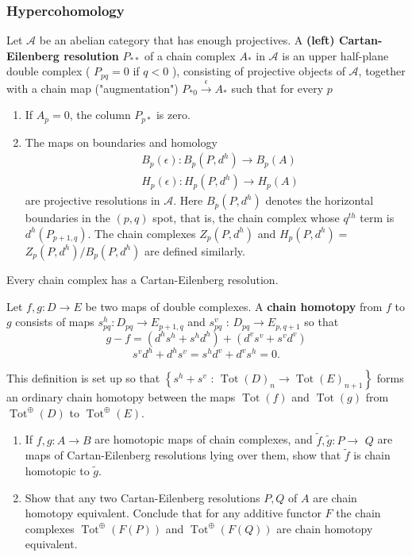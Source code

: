\subsubsection{Hypercohomology}
Let $\mathcal{A}$ be an abelian category that has enough projectives. A\textbf{ (left) Cartan-Eilenberg resolution} $P_{* *}$ of a chain complex $A_*$ in $\mathcal{A}$ is an upper half-plane double complex ( $P_{p q}=0$ if $q<0$ ), consisting of projective objects of $\mathcal{A}$, together with a chain map ("augmentation") $P_{* 0} \xrightarrow{\epsilon} A_*$ such that for every $p$
\begin{enumerate}
    \item If $A_p=0$, the column $P_{p *}$ is zero.
    \item The maps on boundaries and homology
    $$
    \begin{aligned}
    & B_p(\epsilon): B_p\left(P, d^h\right) \rightarrow B_p(A) \\
    & H_p(\epsilon): H_p\left(P, d^h\right) \rightarrow H_p(A)
    \end{aligned}
    $$
    are projective resolutions in $\mathcal{A}$. Here $B_p\left(P, d^h\right)$ denotes the horizontal boundaries in the $(p, q)$ spot, that is, the chain complex whose $q^{t h}$ term is $d^h\left(P_{p+1, q}\right)$. The chain complexes $Z_p\left(P, d^h\right)$ and $H_p\left(P, d^h\right)=$ $Z_p\left(P, d^h\right) / B_p\left(P, d^h\right)$ are defined similarly.
\end{enumerate}

\begin{lemm}
    Every chain complex has a Cartan-Eilenberg resolution.
\end{lemm}

Let $f, g: D \rightarrow E$ be two maps of double complexes. A \textbf{chain homotopy} from $f$ to $g$ consists of maps $s_{p q}^h: D_{p q} \rightarrow E_{p+1, q}$ and $s_{p q}^v$ : $D_{p q} \rightarrow E_{p, q+1}$ so that
\[
g-f = (d^h s^h + s^h d^h) + (d^v s^v + s^v d^v)
\]
\[
s^v d^h+d^h s^v=s^h d^v+d^v s^h=0.
\]

This definition is set up so that $\left\{s^h+s^v\right.$ : $\left.\operatorname{Tot}(D)_n \rightarrow \operatorname{Tot}(E)_{n+1}\right\}$ forms an ordinary chain homotopy between the maps $\operatorname{Tot}(f)$ and $\operatorname{Tot}(g)$ from $\operatorname{Tot}^{\oplus}(D)$ to $\operatorname{Tot}^{\oplus}(E)$.

\begin{prop}
    \begin{enumerate}
        \item If $f, g: A \rightarrow B$ are homotopic maps of chain complexes, and $\tilde{f}, \tilde{g}: P \rightarrow$ $Q$ are maps of Cartan-Eilenberg resolutions lying over them, show that $\tilde{f}$ is chain homotopic to $\tilde{g}$.
        \item Show that any two Cartan-Eilenberg resolutions $P, Q$ of $A$ are chain homotopy equivalent. Conclude that for any additive functor $F$ the chain complexes $\operatorname{Tot}^{\oplus}(F(P))$ and $\operatorname{Tot}^{\oplus}(F(Q))$ are chain homotopy equivalent.
    \end{enumerate}
\end{prop}



